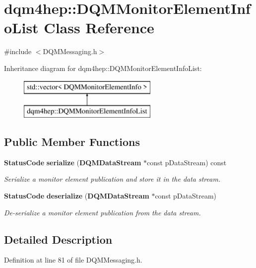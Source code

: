 \section{dqm4hep\+:\+:D\+Q\+M\+Monitor\+Element\+Info\+List Class Reference}
\label{classdqm4hep_1_1DQMMonitorElementInfoList}


{\ttfamily \#include $<$D\+Q\+M\+Messaging.\+h$>$}

Inheritance diagram for dqm4hep\+:\+:D\+Q\+M\+Monitor\+Element\+Info\+List\+:\begin{figure}[H]
\begin{center}
\leavevmode
\includegraphics[height=2.000000cm]{classdqm4hep_1_1DQMMonitorElementInfoList}
\end{center}
\end{figure}
\subsection*{Public Member Functions}
\begin{DoxyCompactItemize}
\item 
{\bf Status\+Code} {\bf serialize} ({\bf D\+Q\+M\+Data\+Stream} $\ast$const p\+Data\+Stream) const 
\begin{DoxyCompactList}\small\item\em Serialize a monitor element publication and store it in the data stream. \end{DoxyCompactList}\item 
{\bf Status\+Code} {\bf deserialize} ({\bf D\+Q\+M\+Data\+Stream} $\ast$const p\+Data\+Stream)
\begin{DoxyCompactList}\small\item\em De-\/serialize a monitor element publication from the data stream. \end{DoxyCompactList}\end{DoxyCompactItemize}


\subsection{Detailed Description}


Definition at line 81 of file D\+Q\+M\+Messaging.\+h.



